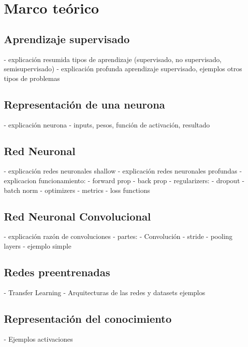 \section{Marco teórico}
\subsection{Aprendizaje supervisado}
- explicación resumida tipos de aprendizaje (supervisado, no supervisado, semisupervisado)
- explicación profunda aprendizaje supervisado, ejemplos otros tipos de problemas

\subsection{Representación de una neurona}
- explicación neurona
- inputs, pesos, función de activación, resultado

\subsection{Red Neuronal}
- explicación redes neuronales shallow
- explicación redes neuronales profundas
- explicacion funcionamiento:
	- forward prop
	- back prop
	- regularizers:
		- dropout
		- batch norm
	- optimizers
	- metrics
	- loss functions
	
\subsection{Red Neuronal Convolucional}
- explicación razón de convoluciones
- partes:
	- Convolución
	- stride
	- pooling layers
- ejemplo simple

\subsection{Redes preentrenadas} 
- Transfer Learning
- Arquitecturas de las redes y datasets ejemplos

\subsection{Representación del conocimiento}
- Ejemplos activaciones